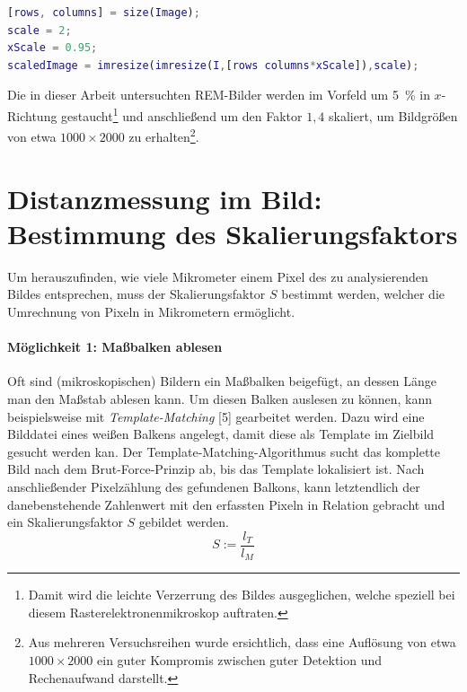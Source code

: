 \documentclass[accentcolor=tud1c, 11pt, toc=bib, toc=listof, captions=abovetable, parskip=half]{tudreport}
\begin{document}
\begin{lstlisting}[language=MATLAB, caption=Bildskalierung in \textsc{Matlab}, label=lst:imageresizing]
[rows, columns] = size(Image);
scale = 2;
xScale = 0.95;
scaledImage = imresize(imresize(I,[rows columns*xScale]),scale);
\end{lstlisting}

Die in dieser Arbeit untersuchten REM-Bilder werden im Vorfeld um \SI{5}{\percent} in $x$-Richtung gestaucht\footnote{Damit wird die leichte Verzerrung des Bildes ausgeglichen, welche speziell bei diesem Rasterelektronenmikroskop auftraten.} und anschließend um den Faktor $1,4$ skaliert, um Bildgrößen von etwa $1000\times2000$ zu erhalten\footnote{Aus mehreren Versuchsreihen wurde ersichtlich, dass eine Auflösung von etwa $1000\times2000$ ein guter Kompromis zwischen guter Detektion und Rechenaufwand darstellt.}.\\

\section{Distanzmessung im Bild: Bestimmung des Skalierungsfaktors}
\label{sec:kalibrierungsfaktor}
Um herauszufinden, wie viele Mikrometer einem Pixel des zu analysierenden Bildes entsprechen, muss  der Skalierungsfaktor $S$ bestimmt werden, welcher die Umrechnung von Pixeln in Mikrometern ermöglicht.

\paragraph{Möglichkeit 1: Maßbalken ablesen}
Oft sind (mikroskopischen) Bildern ein Maßbalken beigefügt, an dessen Länge man den Maßstab ablesen kann. Um diesen Balken auslesen zu können, kann beispielsweise mit \textit{Template-Matching} [5] gearbeitet werden. Dazu wird eine Bilddatei eines weißen Balkens angelegt, damit diese als Template im Zielbild gesucht werden kan. Der Template-Matching-Algorithmus sucht das komplette Bild nach dem Brut-Force-Prinzip ab, bis das Template lokalisiert ist. Nach anschließender Pixelzählung des gefundenen Balkons, kann letztendlich der danebenstehende Zahlenwert mit den erfassten Pixeln in Relation gebracht und ein Skalierungsfaktor $S$ gebildet werden.\\

\begin{equation}
S := \frac{l_T}{l_M}
\label{eq:skalierungsfaktor}
\end{equation}
\end{document}
